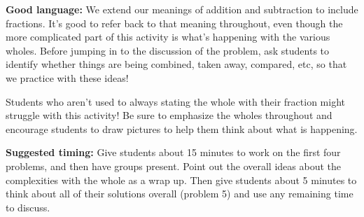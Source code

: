 \documentclass[nooutcomes,noauthor, handout]{ximera}
\begin{document}
\begin{instructorNotes}
{\bf Good language:}  We extend our meanings of addition and subtraction to include fractions. It's good to refer back to that meaning throughout, even though the more complicated part of this activity is what's happening with the various wholes. Before jumping in to the discussion of the problem, ask students to identify whether things are being combined, taken away, compared, etc, so that we practice with these ideas!

Students who aren't used to always stating the whole with their fraction might struggle with this activity! Be sure to emphasize the wholes throughout and encourage students to draw pictures to help them think about what is happening.




{\bf Suggested timing:} Give students about 15 minutes to work on the first four problems, and then have groups present. Point out the overall ideas about the complexities with the whole as a wrap up. Then give students about 5 minutes to think about all of their solutions overall (problem 5) and use any remaining time to discuss.


\end{instructorNotes}
\end{document}
